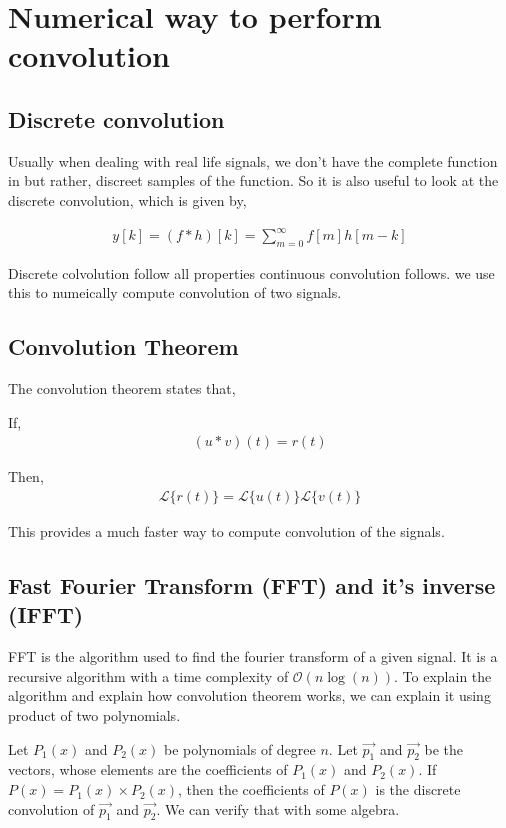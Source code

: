 \section{Numerical way to perform convolution}
\subsection{Discrete convolution}

Usually when dealing with real life signals, we don't have the complete function in but rather, discreet samples of the function. So it is also useful to look at the discrete convolution, which is given by,

\begin{align*}
    y[k] = (f*h)[k] = \sum_{m=0}^{\infty} f[m]h[m-k]
\end{align*}

Discrete colvolution follow all properties continuous convolution follows. we use this to numeically compute convolution of two signals.

\subsection{Convolution Theorem}

The convolution theorem states that,

If,
\begin{align*}
    (u*v)(t) = r(t)
\end{align*}

Then,
\begin{align*}
    \mathcal{L}\{r(t)\} = \mathcal{L}\{u(t)\}\mathcal{L}\{v(t)\}
\end{align*}

This provides a much faster way to compute convolution of the signals.

\subsection{Fast Fourier Transform (FFT) and it's inverse (IFFT)}

FFT is the algorithm used to find the fourier transform of a given signal. It is a recursive algorithm with a time complexity of $\mathcal{O}(n\log(n))$. To explain the algorithm and explain how convolution theorem works, we can explain it using product of two polynomials.

Let $P_1(x)$ and $P_2(x)$ be polynomials of degree $n$. Let $\vec{p_1}$ and $\vec{p_2}$ be the vectors, whose elements are the coefficients of $P_1(x)$ and $P_2(x)$.
If $P(x) = P_1(x)\times P_2(x)$, then the coefficients of $P(x)$ is the discrete convolution of $\vec{p_1}$ and $\vec{p_2}$. We can verify that with some algebra.

